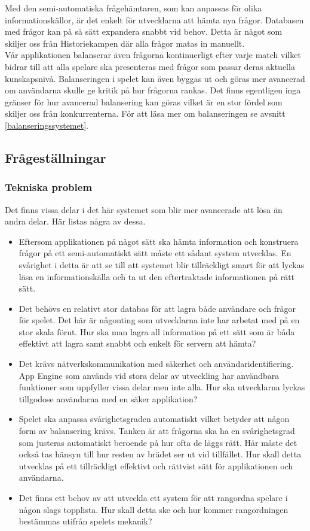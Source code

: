 \documentclass[a4paper, 11pt]{article}
\begin{document}
Med den semi-automatiska frågehämtaren, som kan anpassas för olika informationskällor, är det enkelt för utvecklarna att hämta nya frågor. Databasen med frågor kan på så sätt expandera snabbt vid behov. Detta är något som skiljer oss från Historiekampen där alla frågor matas in manuellt. \\
Vår applikationen balanserar även frågorna kontinuerligt efter varje match vilket bidrar till att alla spelare ska presenteras med frågor som passar deras aktuella kunskapsnivå. Balanseringen i spelet kan även byggas ut och göras mer avancerad om användarna skulle ge kritik på hur frågorna rankas. Det finns egentligen inga gränser för hur avancerad balansering kan göras vilket är en stor fördel som skiljer oss från konkurrenterna. För att läsa mer om balanseringen se avsnitt \ref{balanseringssystemet}.

\subsection{Frågeställningar}

\subsubsection{Tekniska problem}
Det finns vissa delar i det här systemet som blir mer avancerade att lösa än andra delar. Här listas några av dessa.
\begin{itemize}
\item Eftersom applikationen på något sätt ska hämta information och konstruera frågor på ett semi-automatiskt sätt måste ett sådant system utvecklas. En svårighet i detta är att se till att systemet blir tillräckligt smart för att lyckas läsa en informationskälla och ta ut den eftertraktade informationen på rätt sätt.
\item Det behövs en relativt stor databas för att lagra både användare och frågor för spelet. Det här är någonting som utvecklarna inte har arbetat med på en stor skala förut. Hur ska man lagra all information på ett sätt som är båda effektivt att lagra samt snabbt och enkelt för servern att hämta?
\item Det krävs nätverkskommunikation med säkerhet och användaridentifiering. App Engine som används vid stora delar av utveckling har användbara funktioner som uppfyller vissa delar men inte alla. Hur ska utvecklarna lyckas tillgodose användarna med en säker applikation?
\item Spelet ska anpassa svårighetsgraden automatiskt vilket betyder att någon form av balansering krävs. Tanken är att frågorna ska ha en svårighetsgrad som justeras automatiskt beroende på hur ofta de läggs rätt. Här måste det också tas hänsyn till hur resten av brädet ser ut vid tillfället. Hur skall detta utvecklas på ett tillräckligt effektivt och rättvist sätt för applikationen och användarna.
\item Det finns ett behov av att utveckla ett system för att rangordna spelare i någon slags topplista. Hur skall detta ske och hur kommer rangordningen bestämmas utifrån spelets mekanik? 
\end{itemize}
\end{document}
